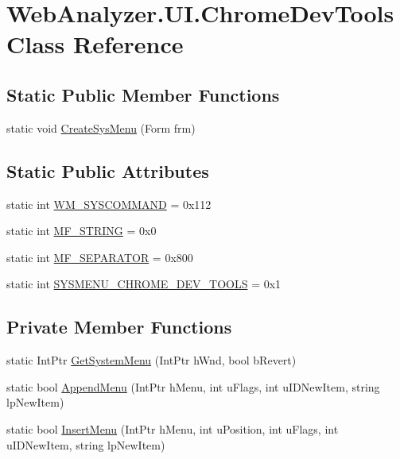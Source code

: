 \hypertarget{class_web_analyzer_1_1_u_i_1_1_chrome_dev_tools}{}\section{Web\+Analyzer.\+U\+I.\+Chrome\+Dev\+Tools Class Reference}
\label{class_web_analyzer_1_1_u_i_1_1_chrome_dev_tools}
\subsection*{Static Public Member Functions}
\begin{DoxyCompactItemize}
\item 
static void \hyperlink{class_web_analyzer_1_1_u_i_1_1_chrome_dev_tools_a5b1875fb369de2a349c85c682c6b924d}{Create\+Sys\+Menu} (Form frm)
\end{DoxyCompactItemize}
\subsection*{Static Public Attributes}
\begin{DoxyCompactItemize}
\item 
static int \hyperlink{class_web_analyzer_1_1_u_i_1_1_chrome_dev_tools_a4e5a194cb8f1eb30877f810655d14f6f}{W\+M\+\_\+\+S\+Y\+S\+C\+O\+M\+M\+A\+N\+D} = 0x112
\item 
static int \hyperlink{class_web_analyzer_1_1_u_i_1_1_chrome_dev_tools_a244dc36662bbe1c31e4d104e1e9cfa30}{M\+F\+\_\+\+S\+T\+R\+I\+N\+G} = 0x0
\item 
static int \hyperlink{class_web_analyzer_1_1_u_i_1_1_chrome_dev_tools_ac94ae0f0342e7cf49ae9b781e72a2e34}{M\+F\+\_\+\+S\+E\+P\+A\+R\+A\+T\+O\+R} = 0x800
\item 
static int \hyperlink{class_web_analyzer_1_1_u_i_1_1_chrome_dev_tools_a732c882f4d627f0aae88b1a38ddf03d2}{S\+Y\+S\+M\+E\+N\+U\+\_\+\+C\+H\+R\+O\+M\+E\+\_\+\+D\+E\+V\+\_\+\+T\+O\+O\+L\+S} = 0x1
\end{DoxyCompactItemize}
\subsection*{Private Member Functions}
\begin{DoxyCompactItemize}
\item 
static Int\+Ptr \hyperlink{class_web_analyzer_1_1_u_i_1_1_chrome_dev_tools_a5f26e568b0faa949bfb8abe6e822bbbe}{Get\+System\+Menu} (Int\+Ptr h\+Wnd, bool b\+Revert)
\item 
static bool \hyperlink{class_web_analyzer_1_1_u_i_1_1_chrome_dev_tools_a9bd8dacdf2149f7fe284c4b9b0c7c3b1}{Append\+Menu} (Int\+Ptr h\+Menu, int u\+Flags, int u\+I\+D\+New\+Item, string lp\+New\+Item)
\item 
static bool \hyperlink{class_web_analyzer_1_1_u_i_1_1_chrome_dev_tools_aeff8af7c2415ce1802cb8a0dfbf8bba0}{Insert\+Menu} (Int\+Ptr h\+Menu, int u\+Position, int u\+Flags, int u\+I\+D\+New\+Item, string lp\+New\+Item)
\end{DoxyCompactItemize}


